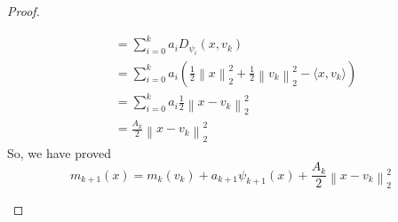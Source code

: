 \documentclass{article}
\begin{document}
\begin{proof}
\begin{enumerate}[(i)]
\begin{align*}
                &=\sum_{i=0}^k a_i D_{\psi_i}(x,v_k)\\
                &=\sum_{i=0}^k a_i \left(
                    \frac{1}{2}\left\lVert x \right \rVert_2^2
                    +\frac{1}{2}\left\lVert v_k \right \rVert_2^2
                    -\langle x,v_k \rangle
                    \right)\\
                &=\sum_{i=0}^k a_i \frac{1}{2}\left\lVert x-v_k \right \rVert_2^2\\
                &=\frac{A_k}{2}\left\lVert x-v_k \right \rVert_2^2
            \end{align*}
            So, we have proved
            $$m_{k+1}(x)=m_k(v_k)+a_{k+1}\psi_{k+1}(x)+\frac{A_k}{2}\left\lVert x-v_k \right \rVert_2^2$$
        \end{enumerate}
    \end{proof}


\end{document}
